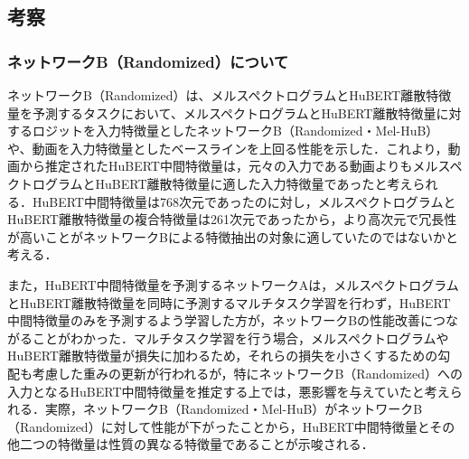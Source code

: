 \subsection{考察}
\subsubsection{ネットワークB（Randomized）について}
ネットワークB（Randomized）は、メルスペクトログラムとHuBERT離散特徴量を予測するタスクにおいて、メルスペクトログラムとHuBERT離散特徴量に対するロジットを入力特徴量としたネットワークB（Randomized・Mel-HuB）や、動画を入力特徴量としたベースラインを上回る性能を示した．これより，動画から推定されたHuBERT中間特徴量は，元々の入力である動画よりもメルスペクトログラムとHuBERT離散特徴量に適した入力特徴量であったと考えられる．HuBERT中間特徴量は768次元であったのに対し，メルスペクトログラムとHuBERT離散特徴量の複合特徴量は261次元であったから，より高次元で冗長性が高いことがネットワークBによる特徴抽出の対象に適していたのではないかと考える．

また，HuBERT中間特徴量を予測するネットワークAは，メルスペクトログラムとHuBERT離散特徴量を同時に予測するマルチタスク学習を行わず，HuBERT中間特徴量のみを予測するよう学習した方が，ネットワークBの性能改善につながることがわかった．マルチタスク学習を行う場合，メルスペクトログラムやHuBERT離散特徴量が損失に加わるため，それらの損失を小さくするための勾配も考慮した重みの更新が行われるが，特にネットワークB（Randomized）への入力となるHuBERT中間特徴量を推定する上では，悪影響を与えていたと考えられる．実際，ネットワークB（Randomized・Mel-HuB）がネットワークB（Randomized）に対して性能が下がったことから，HuBERT中間特徴量とその他二つの特徴量は性質の異なる特徴量であることが示唆される．

